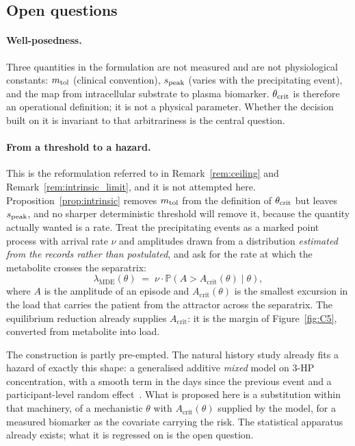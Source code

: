 \subsection{Open questions}

\paragraph{Well-posedness.} Three quantities in the formulation are not measured and are
not physiological constants: $m_{\mathrm{tol}}$ (clinical convention), $s_{\mathrm{peak}}$ (varies with the
precipitating event), and the map from intracellular substrate to plasma biomarker. $\theta_{\mathrm{crit}}$
is therefore an operational definition; it is not a physical parameter. Whether the
decision built on it is invariant to that arbitrariness is the central question.

\paragraph{From a threshold to a hazard.}
\label{sec:hazard} This is the reformulation referred to in
Remark~\ref{rem:ceiling} and Remark~\ref{rem:intrinsic_limit}, and it is
not attempted here. Proposition~\ref{prop:intrinsic} removes $m_{\mathrm{tol}}$ from the definition
of $\theta_{\mathrm{crit}}$ but leaves $s_{\mathrm{peak}}$, and no sharper deterministic threshold will remove it, because
the quantity actually wanted is a rate. Treat the precipitating events as a marked
point process with arrival rate $\nu$ and amplitudes drawn from a distribution
\emph{estimated from the records rather than postulated}, and ask for the rate at which the
metabolite crosses the separatrix:
\begin{equation}
\lambda_{\mathrm{MDE}}(\theta) \;=\; \nu \cdot
\mathbb{P}\!\left(A > A_{\mathrm{crit}}(\theta) \mid \theta \right),
\label{eq:hazard}
\end{equation}
where $A$ is the amplitude of an episode and $A_{\mathrm{crit}}(\theta)$ is the smallest
excursion in the load that carries the patient from the attractor across the separatrix.
The equilibrium reduction already supplies $A_{\mathrm{crit}}$: it is the margin of
Figure~\ref{fig:C5},
converted from metabolite into load.

The construction is partly pre-empted. The natural history study already fits a hazard of
exactly this
shape: a generalised additive \emph{mixed} model on 3-HP concentration, with a smooth term
in the days since the previous event and a participant-level random
effect~\cite{natural_history}. %
What is proposed here is a substitution within that machinery, of a mechanistic $\theta$
with $A_{\mathrm{crit}}(\theta)$ supplied by the model, for a measured biomarker as the
covariate carrying the risk. The statistical apparatus already exists; what it is
regressed on is the open question.

